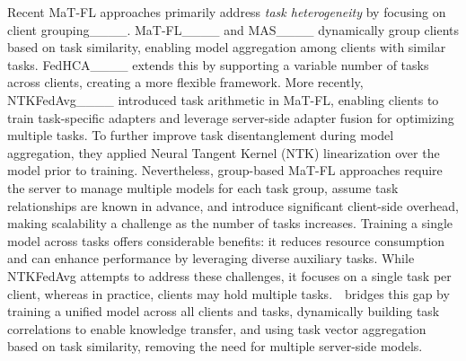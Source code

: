 Recent MaT-FL approaches primarily address \textit{task heterogeneity} by focusing on client grouping____. MaT-FL____ and MAS____ dynamically group clients based on task similarity, enabling model aggregation among clients with similar tasks. FedHCA____ extends this by supporting a variable number of tasks across clients, creating a more flexible framework. More recently, NTKFedAvg____ introduced task arithmetic in MaT-FL, enabling clients to train task-specific adapters and leverage server-side adapter fusion for optimizing multiple tasks. To further improve task disentanglement during model aggregation, they applied Neural Tangent Kernel (NTK) linearization over the model prior to training. Nevertheless, group-based MaT-FL approaches require the server to manage multiple models for each task group, assume task relationships are known in advance, and introduce significant client-side overhead, making scalability a challenge as the number of tasks increases. Training a single model across tasks offers considerable benefits: it reduces resource consumption and can enhance performance by leveraging diverse auxiliary tasks. While NTKFedAvg attempts to address these challenges, it focuses on a single task per client, whereas in practice, clients may hold multiple tasks.~\method~bridges this gap by training a unified model across all clients and tasks, dynamically building task correlations to enable knowledge transfer, and using task vector aggregation based on task similarity, removing the need for multiple server-side models.